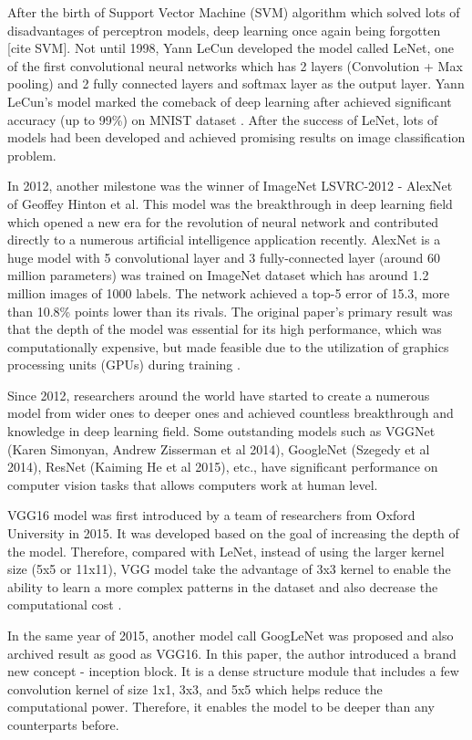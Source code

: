 	After the birth of Support Vector Machine (SVM) algorithm which solved lots of disadvantages of perceptron models, deep learning once again being forgotten [cite SVM]. Not until 1998, Yann LeCun developed the model called LeNet, one of the first convolutional neural networks which has 2 layers (Convolution + Max pooling) and 2 fully connected layers and softmax layer as the output layer. Yann LeCun’s model marked the comeback of deep learning after achieved significant accuracy (up to 99\%) on MNIST dataset \cite{lenet}. After the success of LeNet, lots of models had been developed and achieved promising results on image classification problem.	
	
	In 2012, another milestone was the winner of ImageNet LSVRC-2012 - AlexNet of Geoffey Hinton et al. This model was the breakthrough in deep learning field which opened a new era for the revolution of neural network and contributed directly to a numerous artificial intelligence application recently. AlexNet is a huge model with 5 convolutional layer and 3 fully-connected layer (around 60 million parameters) was trained on ImageNet dataset which has around 1.2 million images of 1000 labels. The network achieved a top-5 error of 15.3, more than 10.8\% points lower than its rivals. The original paper's primary result was that the depth of the model was essential for its high performance, which was computationally expensive, but made feasible due to the utilization of graphics processing units (GPUs) during training \cite{alexnet}.

	Since 2012, researchers around the world have started to create a numerous model from wider ones to deeper ones and achieved countless breakthrough and knowledge in deep learning field. Some outstanding models such as VGGNet (Karen Simonyan, Andrew Zisserman et al 2014), GoogleNet (Szegedy et al 2014), ResNet (Kaiming He et al 2015), etc., have significant performance on computer vision tasks that allows computers work at human level.
	
	VGG16 model was first introduced by a team of researchers from Oxford University in 2015. It was developed based on the goal of increasing the depth of the model. Therefore, compared with LeNet, instead of using the larger kernel size (5x5 or 11x11), VGG model take the advantage of 3x3 kernel to enable the ability to learn a more complex patterns  in the dataset and also decrease the computational cost \cite{vgg}.
	
	In the same year of 2015, another model call GoogLeNet was proposed and also archived result as good as VGG16. In this paper, the author introduced a brand new concept - inception block. It is a dense structure module that includes a few convolution kernel of size 1x1, 3x3, and 5x5 which helps reduce the computational power. Therefore, it enables the model to be deeper than any counterparts before.
	
